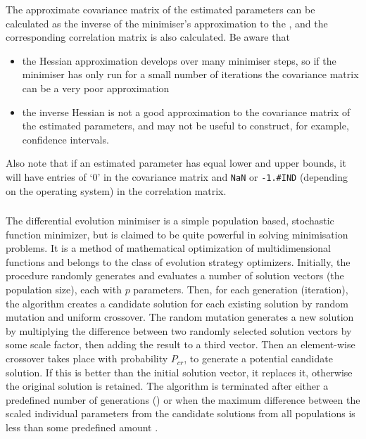 The approximate covariance matrix of the estimated parameters can be calculated as the inverse of the minimiser's approximation to the , and the corresponding correlation matrix is also calculated. Be aware that

\begin{itemize}
\item the Hessian approximation develops over many minimiser steps, so if the minimiser has only run for a small number of iterations the covariance matrix can be a very poor approximation
\item the inverse Hessian is not a good approximation to the covariance matrix of the estimated parameters, and may not be useful to construct, for example, confidence intervals. 
\end{itemize}

Also note that if an estimated parameter has equal lower and upper bounds, it will have entries of `0' in the covariance matrix and \texttt{NaN} or \texttt{-1.\#IND} (depending on the operating system) in the correlation matrix. 

\subsubsection{}

The differential evolution minimiser is a simple population based, stochastic function minimizer, but is claimed to be quite powerful in solving minimisation problems. It is a method of mathematical optimization of multidimensional functions and belongs to the class of evolution strategy optimizers. Initially, the procedure randomly generates and evaluates a number of solution vectors (the population size), each with $p$ parameters. Then, for each generation (iteration), the algorithm creates a candidate solution for each existing solution by random mutation and uniform crossover. The random mutation generates a new solution by multiplying the difference between two randomly selected solution vectors by some scale factor, then adding the result to a third vector. Then an element-wise crossover takes place with probability $P_{cr}$, to generate a potential candidate solution. If this is better than the initial solution vector, it replaces it, otherwise the original solution is retained. The algorithm is terminated after either a predefined number of generations () or when the maximum difference between the scaled individual parameters from the candidate solutions from all populations is less than some predefined amount .

